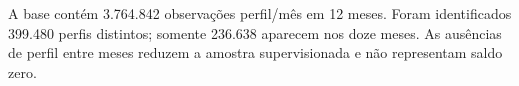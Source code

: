 A base contém 3.764.842 observações perfil/mês em 12 meses. Foram identificados 399.480 perfis distintos; somente 236.638 aparecem nos doze meses. As ausências de perfil entre meses reduzem a amostra supervisionada e não representam saldo zero.